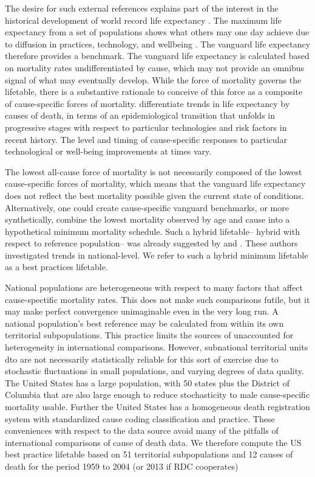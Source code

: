 \documentclass[11pt,oneside,a4paper]{article} %
\begin{document}
The desire for such external references explains part of the interest in the
historical development of world record life expectancy \citep{oeppen2002broken}.
The maximum life expectancy from a set of populations shows what others may one
day achieve due to diffusion in practices, technology, and wellbeing
\citep{vallin2010esperance}.
The vanguard life expectancy therefore provides a benchmark. The vanguard life expectancy is calculated based on mortality rates undifferentiated
by cause, which may not provide an omnibus signal of what may eventually develop. While the force of mortality governs the lifetable, there is a substantive rationale to conceive of this force as a composite of cause-specific forces of mortality. \citet{vallin2008minimum} differentiate trends in life expectancy by causes of death, in terms of an epidemiological transition that unfolds in progressive stages with respect to particular technologies and risk factors in recent history. The level and timing of cause-specific responses to particular technological or well-being improvements at times vary.

The lowest all-cause force of mortality is not necessarily composed of the
lowest cause-specific forces of mortality, which means that the vanguard life
expectancy does not reflect the best mortality possible given the current state
of conditions. Alternatively, one could create cause-specific vanguard
benchmarks, or more synthetically, combine the lowest mortality observed by age
and cause into a hypothetical minimum mortality schedule. Such a hybrid
lifetable-- hybrid with respect to reference population-- was already suggested
by \citet{wunsch1975minimum} and \citet{vallin2008minimum}. These authors
investigated trends in national-level. We refer to such a hybrid minimum
lifetable as a best practices lifetable. 

National populations are heterogeneous with respect to many factors that affect cause-spectific mortality rates. This does not make such comparisons futile, but it may make perfect convergence unimaginable even in the very long run. A national population's best reference may be calculated from within its own territorial subpopulations. This practice limits the sources of unaccounted for heterogeneity in international comparisons. However, subnational territorial units dto are not necessarily statistically reliable for this sort of exercise due to stochastic fluctuations in small populations, and varying degrees of data quality. The United States has a large population, with 50 states plus the District of Columbia that are also large enough to reduce stochasticity to male cause-specific mortality usable. Further the United States has a homogeneous death registration system with  standardized cause coding classification and practice. These conveniences with respect to the data source avoid many of the pitfalls of international comparisons of cause of death data. We therefore compute the US best practice lifetable based on 51 territorial subpopulations and 12 causes of death for the period 1959 to 2004 (or 2013 if RDC cooperates) 


%
\end{document}
